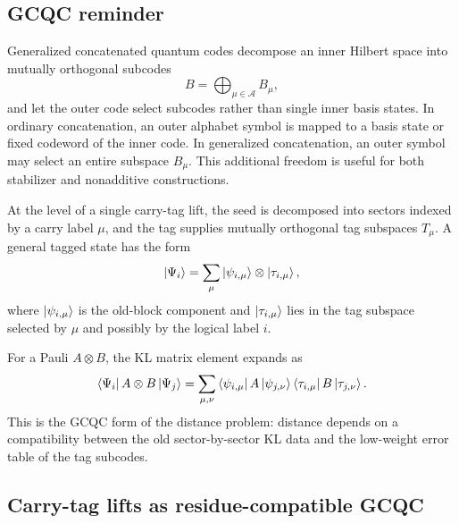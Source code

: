\documentclass[11pt]{article}
\begin{document}
\subsection{GCQC reminder}

Generalized concatenated quantum codes decompose an inner Hilbert space into mutually orthogonal
subcodes~\cite{GrasslShorSmithSmolinZeng2009}
\begin{equation}
  B=\bigoplus_{\mu\in\mathcal A}B_\mu,
  \label{eq:gcqc-inner-decomposition}
\end{equation}
and let the outer code select subcodes rather than single inner basis states.  In ordinary
concatenation, an outer alphabet symbol is mapped to a basis state or fixed codeword of the inner
code.  In generalized concatenation, an outer symbol may select an entire subspace $B_\mu$.
This additional freedom is useful for both stabilizer and nonadditive constructions.

At the level of a single carry-tag lift, the seed is decomposed into sectors indexed by a carry
label $\mu$, and the tag supplies mutually orthogonal tag subspaces $T_\mu$.  A general tagged
state has the form
\begin{equation}
  \ket{\Psi_i}=\sum_{\mu}\ket{\psi_{i,\mu}}\otimes\ket{\tau_{i,\mu}},
  \label{eq:general-tagged-state}
\end{equation}
where $\ket{\psi_{i,\mu}}$ is the old-block component and $\ket{\tau_{i,\mu}}$ lies in the tag
subspace selected by $\mu$ and possibly by the logical label $i$.

For a Pauli $A\otimes B$, the KL matrix element expands as
\begin{equation}
  \bra{\Psi_i}A\otimes B\ket{\Psi_j}
  =\sum_{\mu,\nu}\bra{\psi_{i,\mu}}A\ket{\psi_{j,\nu}}
  \bra{\tau_{i,\mu}}B\ket{\tau_{j,\nu}}.
  \label{eq:gcqc-kl-expansion}
\end{equation}
This is the GCQC form of the distance problem: distance depends on a compatibility between the
old sector-by-sector KL data and the low-weight error table of the tag subcodes.

\subsection{Carry-tag lifts as residue-compatible GCQC}
\end{document}
